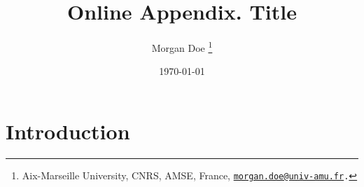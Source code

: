 \documentclass[11pt]{article}
\title{
  Online Appendix. Title
}
\author{
  Morgan Doe
  \thanks{
    Aix-Marseille University, CNRS, AMSE, France, {\tt \href{mailto:morgan.doe@univ-amu.fr}{morgan.doe@univ-amu.fr}.}
  }
}
\date{\today}
\theoremstyle{definition}
\theoremstyle{remark}
\begin{document}
\sloppy %

\if{}
\maketitle
\fi

\newpage
\tableofcontents
\listoffigures
\listoftables
\newpage

\section{Introduction}

\newpage
% 
% 
\end{document}
